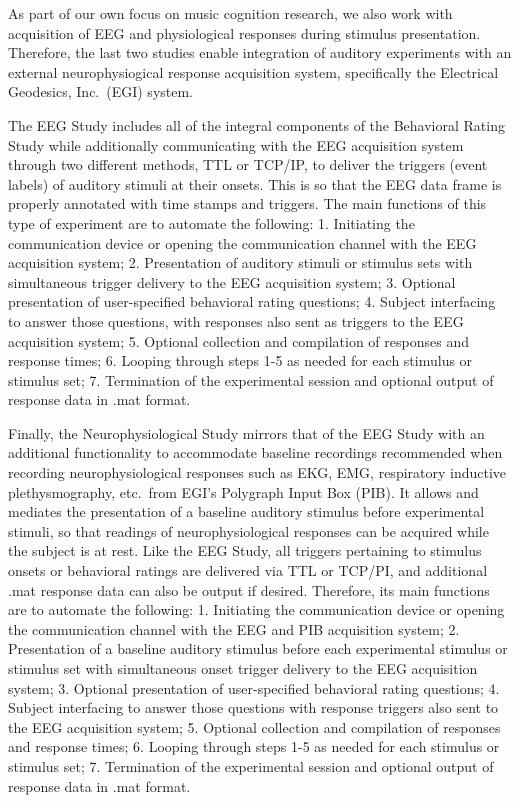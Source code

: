 \documentclass[preprint,12pt, a4paper]{elsarticle}
\begin{document}
As part of our own focus on music cognition research, we also work with acquisition of EEG and physiological responses during stimulus presentation. Therefore, the last two studies enable integration of auditory experiments with an external neurophysiogical response acquisition system, specifically the Electrical Geodesics, Inc.\ (EGI) system.

The EEG Study includes all of the integral components of the Behavioral Rating Study while additionally communicating with the EEG acquisition system through two different methods, TTL or TCP/IP, to deliver the triggers (event labels) of auditory stimuli at their onsets. This is so that the EEG data frame is properly annotated with time stamps and triggers. The main functions of this type of experiment are to automate the following: 1. Initiating the communication device or opening the communication channel with the EEG acquisition system; 2. Presentation of auditory stimuli or stimulus sets with simultaneous trigger delivery to the EEG acquisition system; 3. Optional presentation of user-specified behavioral rating questions; 4. Subject interfacing to answer those questions, with responses also sent as triggers to the EEG acquisition system; 5. Optional collection and compilation of responses and response times; 6. Looping through steps 1-5 as needed for each stimulus or stimulus set; 7. Termination of the experimental session and optional output of response data in .mat format.

Finally, the Neurophysiological Study mirrors that of the EEG Study with an additional functionality to accommodate baseline recordings recommended when recording neurophysiological responses such as EKG, EMG, respiratory inductive plethysmography, etc.\ from EGI's Polygraph Input Box (PIB). It allows and mediates the presentation of a baseline auditory stimulus before experimental stimuli, so that readings of neurophysiological responses can be acquired while the subject is at rest. Like the EEG Study, all triggers pertaining to stimulus onsets or behavioral ratings are delivered via TTL or TCP/PI, and additional .mat response data can also be output if desired. Therefore, its main functions are to automate the following: 1. Initiating the communication device or opening the communication channel with the EEG and PIB acquisition system; 2. Presentation of a baseline auditory stimulus before each experimental stimulus or stimulus set with simultaneous onset trigger delivery to the EEG acquisition system; 3. Optional presentation of user-specified behavioral rating questions; 4. Subject interfacing to answer those questions with response triggers also sent to the EEG acquisition system; 5. Optional collection and compilation of responses and response times; 6. Looping through steps 1-5 as needed for each stimulus or stimulus set; 7. Termination of the experimental session and optional output of response data in .mat format.  
\end{document}
